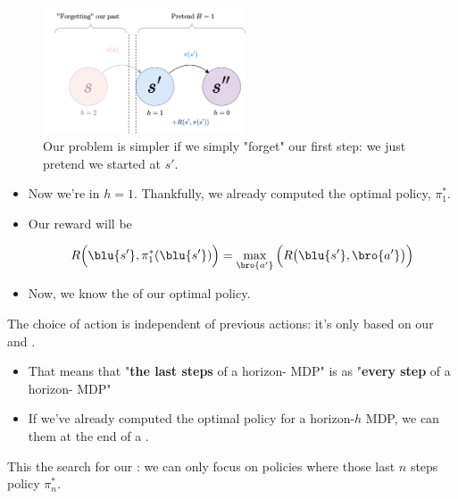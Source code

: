         \begin{figure}[H]
            \centering
            \includegraphics[width=60mm,scale=0.4]{images/mdp_images/h2_forget.png}
            \caption*{Our problem is simpler if we simply "forget" our first step: we just pretend we started at $s'$.}
        \end{figure}

        \begin{itemize}
            \item Now we're in $h=1$. Thankfully, we already computed the optimal policy, $\pi_1^*$.

            \item Our reward will be 

            \begin{equation}
                R\Big( \blu{s'},\pi_1^*(\blu{s'}) \Big) =
                \max_{\bro{a'}}{ \Big( R\big( \blu{s'},\bro{a'}\big) \Big) }
            \end{equation}

            \item Now, we know the  of our optimal policy.\\
        \end{itemize}

        \begin{concept}
            The  choice of action is independent of previous actions: it's only based on our  and .

            \begin{itemize}
                \item That means that "\textbf{the last  steps} of a horizon- MDP" is  as "\textbf{every step} of a horizon- MDP"
                \item If we've already computed the optimal policy for a horizon-$h$ MDP, we can  them at the end of a .
            \end{itemize}

            \subsecdiv

            This  the search for our : we can only focus on policies where those last $n$ steps  policy $\pi_n^*$.
        \end{concept}

